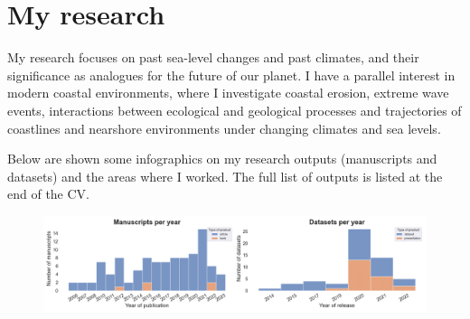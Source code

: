\documentclass[%
               doublesided,
               paper=a4,
               fontsize=10pt
              ]{my-resume}
\begin{document}
{

}
\makebody
\clearpage

\pagestyle{empty}

\section[\faAreaChart]{My research}
\pubforcefullwidth
My research focuses on past sea-level changes and past climates, and their significance as  analogues for the future of our planet. ​I have a parallel interest in modern coastal environments, where I investigate coastal erosion, extreme wave events, interactions between ecological and geological processes and trajectories of coastlines and nearshore environments under changing climates and sea levels. 

\medskip

Below are shown some infographics on my research outputs (manuscripts and datasets) and the areas where I worked. The full list of outputs is listed at the end of the CV.
\medskip

\begin{figure}[h]
\centering
\includegraphics[width=\textwidth]{img/products_per_year.png}
\end{figure}
\end{document}

